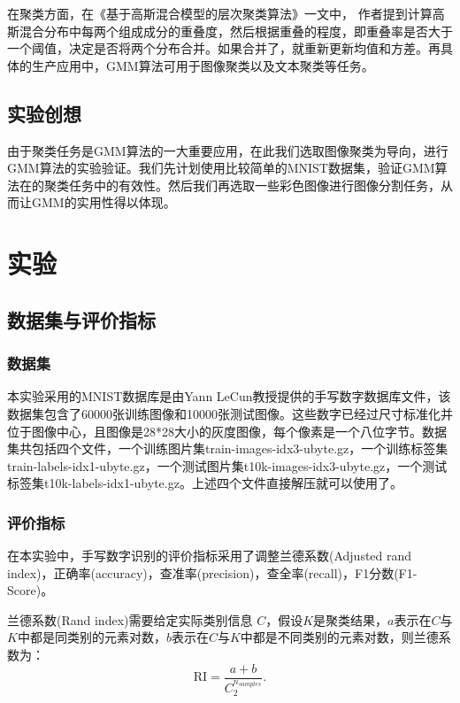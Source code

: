 \documentclass[UTF8]{ctexart}
\begin{document}
在聚类方面，在《基于高斯混合模型的层次聚类算法》一文中， 作者提到计算高斯混合分布中每两个组成成分的重叠度，然后根据重叠的程度，即重叠率是否大于一个阈值，决定是否将两个分布合并。如果合并了，就重新更新均值和方差。再具体的生产应用中，GMM算法可用于图像聚类以及文本聚类等任务。

\subsection{实验创想}
由于聚类任务是GMM算法的一大重要应用，在此我们选取图像聚类为导向，进行GMM算法的实验验证。我们先计划使用比较简单的MNIST数据集，验证GMM算法在的聚类任务中的有效性。然后我们再选取一些彩色图像进行图像分割任务，从而让GMM的实用性得以体现。


\section{实验}

\subsection{数据集与评价指标}

\subsubsection{数据集}
本实验采用的MNIST数据库是由Yann LeCun教授提供的手写数字数据库文件，该数据集包含了60000张训练图像和10000张测试图像。这些数字已经过尺寸标准化并位于图像中心，且图像是28*28大小的灰度图像，每个像素是一个八位字节。数据集共包括四个文件，一个训练图片集train-images-idx3-ubyte.gz，一个训练标签集train-labels-idx1-ubyte.gz，一个测试图片集t10k-images-idx3-ubyte.gz，一个测试标签集t10k-labels-idx1-ubyte.gz。上述四个文件直接解压就可以使用了。

\subsubsection{评价指标}

在本实验中，手写数字识别的评价指标采用了调整兰德系数(Adjusted rand index)，正确率(accuracy)，查准率(precision)，查全率(recall)，F1分数(F1-Score)。

兰德系数(Rand index)需要给定实际类别信息 $C$，假设$K$是聚类结果，$a$表示在$C$与$K$中都是同类别的元素对数，$b$表示在$C$与$K$中都是不同类别的元素对数，则兰德系数为：
\begin{equation}
\mathrm{RI}=\frac{a+b}{C_{2}^{n_{samples}}}.
\end{equation}
\end{document}
